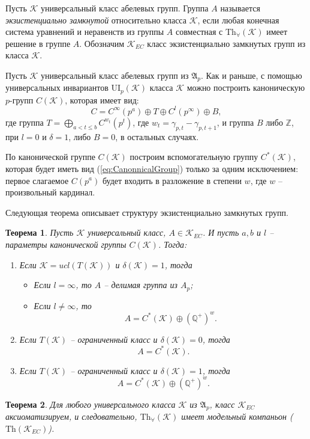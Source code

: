 \documentclass{article} %
\newtheorem{theorem}{Теорема}[section]
\def\proof{{\noindent{\bf Доказательство.}} }
\def\A{{\mathfrak{A}}}
\def\K{{\mathcal{K}}}
\def\Z{{\mathbb{Z}}}
\def\Q{{\mathbb{Q}}}
\def\Th{{\mathrm{Th}}}
\def\Tha{{\mathrm{Th}_\forall}}
\def\ui{{\mathrm{UI}}}
\begin{document}
Пусть $\K$ универсальный класс абелевых групп. Группа $A$ называется \textit{экзистенциально замкнутой} относительно класса $\K$, если любая конечная система уравнений и неравенств из группы $A$ совместная с $\Tha(\K)$ имеет решение в группе $A$. Обозначим $\K_{EC}$ класс экзистенциально замкнутых групп из класса $\K$.

Пусть $\K$ универсальный класс абелевых групп из $\A_p$. Как и раньше, с помощью универсальных инвариантов $\ui_p(\K)$ класса $\K$ можно построить каноническую $p$-групп $C(\K)$, которая имеет вид:
\begin{equation}\label{eq:CanonnicalGroup}
 C = C^\infty(p^a) \oplus T \oplus C^l(p^\infty) \oplus B,
 \end{equation}
где группа $T = \bigoplus\limits_{ a < t \leq b} C^{w_t}(p^t)$, где $w_t = \gamma_{p,t} - \gamma_{p,t+1}$, и группа $B$ либо $\Z$, при $l = 0$ и $\delta = 1$, либо $B = 0$, в остальных случаях.

По канонической группе $C(\K)$ построим вспомогательную группу $C^*(\K)$, которая будет иметь вид (\ref{eq:CanonnicalGroup}) только за одним исключением: первое слагаемое $C(p^a)$ будет входить в разложение в степени $w$, где $w$ -- произвольный кардинал.

Следующая теорема описывает структуру экзистенциально замкнутых групп.
\begin{theorem}
Пусть $\K$ универсальный класс, $A \in \K_{EC}$. И пусть $a, b$ и $l$ -- параметры канонической группы $C(\K)$. Тогда:
\begin{enumerate}
\item Если $\K = ucl(T(\K))$ и $\delta(\K) = 1$, тогда
\begin{itemize}
\item Если $l = \infty$, то $A$ -- делимая группа из $A_p$;
\item Если $l \neq \infty$, то
$$A = C^*(\K) \oplus (\Q^+)^w.$$
\end{itemize}
\item Если $T(\K)$ -- ограниченный класс и $\delta(\K) = 0$, тогда
$$A = C^*(\K).$$
\item Если $T(\K)$ -- ограниченный класс и $\delta(\K) = 1$, тогда
$$A = C^*(\K) \oplus (\Q^+)^w.$$
\end{enumerate}
\end{theorem}

\proof {}

\begin{theorem}
Для любого универсального класса $\K$ из $\A_p$, класс $\K_{EC}$ аксиоматизируем, и следовательно, $\Tha(\K)$ имеет модельный компаньон ($\Th(\K_{EC})$).
\end{theorem}

\proof {}

 
\end{document}
